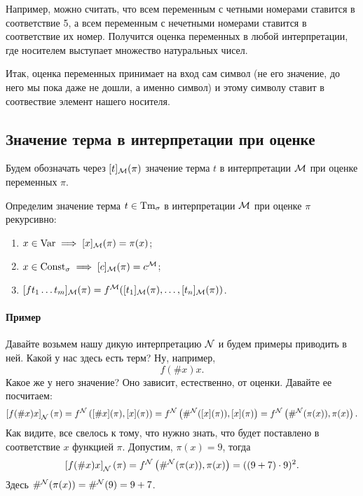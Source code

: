 Например, можно считать, что всем переменным с четными номерами ставится в соответствие 5, а всем переменным с нечетными номерами ставится в соответствие их номер.
Получится оценка переменных в любой интерпретации, где носителем выступает множество натуральных чисел.

Итак, оценка переменных принимает на вход сам символ (не его значение, до него мы пока даже не дошли, а именно символ) и этому символу ставит в соотвествие элемент нашего носителя.

\subsection{Значение терма в интерпретации при оценке}

\begin{notation*}
    Будем обозначать через $[t]_{\mathcal{M}}(\pi)$ значение терма $t$ в интерпретации $\mathcal{M}$ при оценке переменных $\pi$.
\end{notation*}

\begin{definition}
    Определим значение терма $t \in \mathrm{Tm}_{\sigma}$ в интерпретации $\mathcal{M}$ при оценке $\pi$ рекурсивно:
    \begin{enumerate}
        \item $x \in \mathrm{Var} \implies [x]_{\mathcal{M}}(\pi) = \pi(x)$;
        \item $x \in \mathrm{Const}_{\sigma} \implies [c]_{\mathcal{M}}(\pi) = c^{\mathcal{M}}$;
        \item $[f t_{1} \ldots t_{m}]_{\mathcal{M}}(\pi) = f^{\mathcal{M}}([t_{1}]_{\mathcal{M}}(\pi), \ldots, [t_{n}]_{\mathcal{M}}(\pi))$.
    \end{enumerate}
\end{definition}

\paragraph{Пример}
Давайте возьмем нашу дикую интерпретацию $\mathcal{N}$ и будем примеры приводить в ней.
Какой у нас здесь есть терм?
Ну, например,
$$
    f(\# x)x.
$$
Какое же у него значение?
Оно зависит, естественно, от оценки.
Давайте ее посчитаем:
$$
    \left[ f(\# x)x \right]_{\mathcal{N}}(\pi) = f^{\mathcal{N}}\left( [\# x](\pi), [x](\pi) \right) = f^{\mathcal{N}}\left( \#^{\mathcal{N}}([x](\pi)), [x](\pi) \right) = f^{\mathcal{N}}\left( \#^{\mathcal{N}}(\pi(x)), \pi(x) \right).
$$
Как видите, все свелось к тому, что нужно знать, что будет поставлено в соответствие $x$ функцией $\pi$.
Допустим, $\pi(x) = 9$, тогда
$$
    \left[ f(\# x)x \right]_{\mathcal{N}}(\pi) = f^{\mathcal{N}}\left( \#^{\mathcal{N}}(\pi(x)), \pi(x) \right) = ((9 + 7) \cdot 9)^{2}.
$$
Здесь $\#^{\mathcal{N}}(\pi(x)) = \#^{\mathcal{N}}(9) = 9 + 7$.

